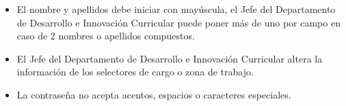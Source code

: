 \begin{itemize}
	\begin{itemize}
		\item El nombre y apellidos debe iniciar con mayúscula, el Jefe del Departamento de Desarrollo e Innovación Curricular puede poner más de uno por campo en caso de 2 nombres o apellidos compuestos.
		\item El Jefe del Departamento de Desarrollo e Innovación Curricular altera la información de los selectores de cargo o zona de trabajo.
		\item La contraseña no acepta acentos, espacios o caracteres especiales.
	\end{itemize}
\end{itemize}